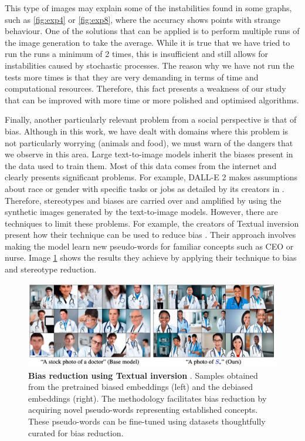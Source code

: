 This type of images may explain some of the instabilities found in some graphs, such as \ref{fig:exp4} or \ref{fig:exp8}, where the accuracy shows points with strange behaviour. One of the solutions that can be applied is to perform multiple runs of the image generation to take the average. While it is true that we have tried to run the runs a minimum of 2 times, this is insufficient and still allows for instabilities caused by stochastic processes. The reason why we have not run the tests more times is that they are very demanding in terms of time and computational resources. Therefore, this fact presents a weakness of our study that can be improved with more time or more polished and optimised algorithms.

Finally, another particularly relevant problem from a social perspective is that of bias. Although in this work, we have dealt with domains where this problem is not particularly worrying (animals and food), we must warn of the dangers that we observe in this area. Large text-to-image models inherit the biases present in the data used to train them. Most of this data comes from the internet and clearly presents significant problems. For example, DALL-E 2 makes assumptions about race or gender with specific tasks or jobs as detailed by its creators in \cite{DALLR}. Therefore, stereotypes and biases are carried over and amplified by using the synthetic images generated by the text-to-image models. However, there are techniques to limit these problems. For example, the creators of Textual inversion present how their technique can be used to reduce bias \cite{gal2022image}. Their approach involves making the model learn new pseudo-words for familiar concepts such as CEO or nurse. Image \ref{fig:bias-textual} shows the results they achieve by applying their technique to bias and stereotype reduction.

\begin{figure}
    \centering
    \includegraphics[width=1\textwidth]{Pictures/bias-text.png} 
    \caption{\textbf{Bias reduction using Textual inversion} \cite{gal2022image}. Samples obtained from the pretrained biased embeddings (left) and the debiased embeddings (right). The methodology facilitates bias reduction by acquiring novel pseudo-words representing established concepts. These pseudo-words can be fine-tuned using datasets thoughtfully curated for bias reduction.}
    \label{fig:bias-textual}
\end{figure}

